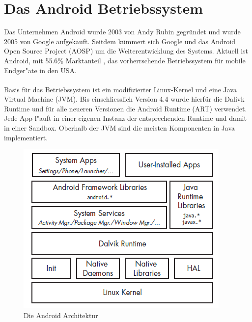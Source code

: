 
\section{Das Android Betriebssystem}
	Das Unternehmen Android wurde 2003 von Andy Rubin gegründet und wurde 2005 von Google aufgekauft. Seitdem kümmert sich Google und das Android Open Source Project (AOSP) um die Weiterentwicklung des Systems. Aktuell ist Android, mit 55.6\% Marktanteil \cite{MobileOsStat}, das vorherrschende Betriebssystem für mobile Endger"ate in den USA.
	\\\\
	Basis für das Betriebssystem ist ein modifizierter Linux-Kernel und eine Java Virtual Machine (JVM). Bis einschliesslich Version 4.4 wurde hierfür die Dalivk Runtime und für alle neueren Versionen die Android Runtime (ART) verwendet. Jede App l"auft in einer eigenen Instanz der entsprechenden Runtime und damit in einer Sandbox.\newline
	Oberhalb der JVM sind die meisten Komponenten in Java implementiert.
	
	\begin{figure}[h]
		\centering
		\includegraphics[width=0.7\linewidth]{android_pages/graphics/architektur_android_.png}
		\caption{Die Android Architektur \protect\cite{Elenkov2014} }
		\label{fig:architektur_android}
	\end{figure}